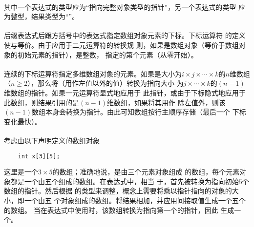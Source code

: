 {                                           
\constraint
\paragraph{}
其中一个表达式的类型应为``指向完整对象类型的指针''，另一个表达式的类型
应为整型，结果类型为``''。

\semantic
\paragraph{}
后缀表达式后跟方括号\tm{[]}中的表达式指定数组对象元素的下标。下标运算符\tm{[]}
的定义使与等价。由于应用于二元\tm{+}运算符的转换规
则，如果是数组对象（等价于数组对象的初始元素的指针），是整数，
指定的第个元素（从零开始）。

\paragraph{}
连续的下标运算符指定多维数组对象的元素。如果是大小为$i\times j\times\cdots
\times k$的$n$维数组（$n\ge 2$），那么将（用作左值以外的值）转换为指向大小
为$j\times\cdots\times k$的$(n-1)$维数组的指针。如果一元\tm{*}运算符显式地应用于
此指针，或由于下标隐式地应用于此数组，则结果引用的是$(n-1)$维数组，如果将其用作
除左值外，则该$(n-1)$数组本身会转换为指针。由此可知数组按行主顺序存储（最后一个
下标变化最快）。

\paragraph{}
\ex 考虑由以下声明定义的数组对象
\begin{lstlisting}
    int x[3][5];
\end{lstlisting}
这里是一个$3\times 5$的数组；准确地说，是由三个元素对象组成
的数组，每个元素对象都是一个由五个组成的数组。在表达式中，相当
于，首先被转换为指向初始$5$个数组的指针。然后根据
的类型来调整，概念上需要将乘以指针指向的对象的大小，即一个由五
个对象组成的数组。将结果相加，并应用间接取值生成一个五个的数组。
当在表达式中使用时，该数组转换为指向第一个的指针，因此
生成一个。


\constraint
}
